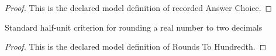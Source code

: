 \begin{proof}
  This is the declared model definition of recorded Answer Choice.
\end{proof}
\begin{definition}
  \label{def:physics:phyx-mini-0434:phyxminiproblems-problemphyxmini0434-roundstohundredth}
  Standard half-unit criterion for rounding a real number to two decimals
\end{definition}
\begin{proof}
  This is the declared model definition of Rounds To Hundredth.
\end{proof}
